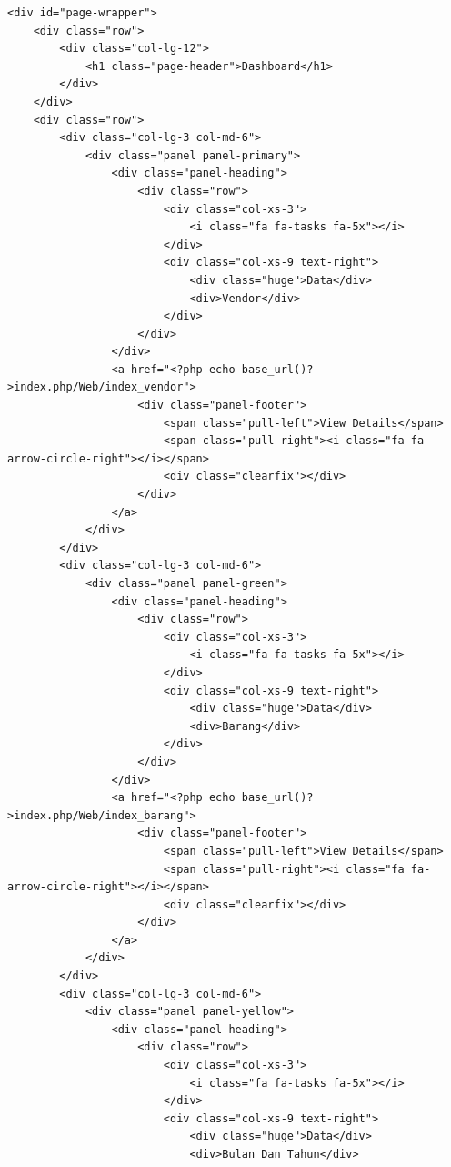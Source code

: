 \begin{enumerate}
\begin{lstlisting}
<div id="page-wrapper">
    <div class="row">
        <div class="col-lg-12">
            <h1 class="page-header">Dashboard</h1>
        </div>
    </div>
    <div class="row">
        <div class="col-lg-3 col-md-6">
            <div class="panel panel-primary">
                <div class="panel-heading">
                    <div class="row">
                        <div class="col-xs-3">
                            <i class="fa fa-tasks fa-5x"></i>
                        </div>
                        <div class="col-xs-9 text-right">
                            <div class="huge">Data</div>
                            <div>Vendor</div>
                        </div>
                    </div>
                </div>
                <a href="<?php echo base_url()?>index.php/Web/index_vendor">
                    <div class="panel-footer">
                        <span class="pull-left">View Details</span>
                        <span class="pull-right"><i class="fa fa-arrow-circle-right"></i></span>
                        <div class="clearfix"></div>
                    </div>
                </a>
            </div>
        </div>
        <div class="col-lg-3 col-md-6">
            <div class="panel panel-green">
                <div class="panel-heading">
                    <div class="row">
                        <div class="col-xs-3">
                            <i class="fa fa-tasks fa-5x"></i>
                        </div>
                        <div class="col-xs-9 text-right">
                            <div class="huge">Data</div>
                            <div>Barang</div>
                        </div>
                    </div>
                </div>
                <a href="<?php echo base_url()?>index.php/Web/index_barang">
                    <div class="panel-footer">
                        <span class="pull-left">View Details</span>
                        <span class="pull-right"><i class="fa fa-arrow-circle-right"></i></span>
                        <div class="clearfix"></div>
                    </div>
                </a>
            </div>
        </div>
        <div class="col-lg-3 col-md-6">
            <div class="panel panel-yellow">
                <div class="panel-heading">
                    <div class="row">
                        <div class="col-xs-3">
                            <i class="fa fa-tasks fa-5x"></i>
                        </div>
                        <div class="col-xs-9 text-right">
                            <div class="huge">Data</div>
                            <div>Bulan Dan Tahun</div>

\end{lstlisting}
\end{enumerate}
